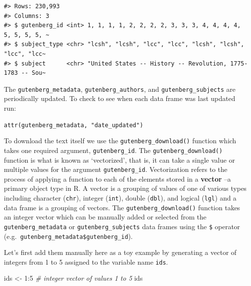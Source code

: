 \documentclass[
  letterpaper,
]{scrbook}
\newenvironment{Shaded}{\begin{snugshade}}{\end{snugshade}}
\newcommand{\CommentTok}[1]{\textcolor[rgb]{0.00,0.00,0.00}{\textit{#1}}}
\newcommand{\DecValTok}[1]{\textcolor[rgb]{0.00,0.00,0.00}{#1}}
\newcommand{\NormalTok}[1]{\textcolor[rgb]{0.00,0.00,0.00}{#1}}
\newcommand{\OtherTok}[1]{\textcolor[rgb]{0.00,0.00,0.00}{#1}}
\newcommand{\SpecialCharTok}[1]{\textcolor[rgb]{0.00,0.00,0.00}{#1}}
\begin{document}
\begin{verbatim}
#> Rows: 230,993
#> Columns: 3
#> $ gutenberg_id <int> 1, 1, 1, 1, 2, 2, 2, 2, 3, 3, 3, 4, 4, 4, 4, 5, 5, 5, 5, ~
#> $ subject_type <chr> "lcsh", "lcsh", "lcc", "lcc", "lcsh", "lcsh", "lcc", "lcc~
#> $ subject      <chr> "United States -- History -- Revolution, 1775-1783 -- Sou~
\end{verbatim}

\begin{tcolorbox}[enhanced jigsaw, title=\textcolor{quarto-callout-warning-color}{\faExclamationTriangle}\hspace{0.5em}{Tip}, titlerule=0mm, toptitle=1mm, colbacktitle=quarto-callout-warning-color!10!white, bottomtitle=1mm, left=2mm, colframe=quarto-callout-warning-color-frame, breakable, toprule=.15mm, colback=white, opacitybacktitle=0.6, leftrule=.75mm, rightrule=.15mm, bottomrule=.15mm, arc=.35mm, coltitle=black, opacityback=0]

The \texttt{gutenberg\_metadata}, \texttt{gutenberg\_authors}, and
\texttt{gutenberg\_subjects} are periodically updated. To check to see
when each data frame was last updated run:

\texttt{attr(gutenberg\_metadata,\ "date\_updated")}

\end{tcolorbox}

To download the text itself we use the \texttt{gutenberg\_download()}
function which takes one required argument, \texttt{gutenberg\_id}. The
\texttt{gutenberg\_download()} function is what is known as
`vectorized', that is, it can take a single value or multiple values for
the argument \texttt{gutenberg\_id}. Vectorization refers to the process
of applying a function to each of the elements stored in a
\textbf{vector} --a primary object type in R. A vector is a grouping of
values of one of various types including character (\texttt{chr}),
integer (\texttt{int}), double (\texttt{dbl}), and logical
(\texttt{lgl}) and a data frame is a grouping of vectors. The
\texttt{gutenberg\_download()} function takes an integer vector which
can be manually added or selected from the \texttt{gutenberg\_metadata}
or \texttt{gutenberg\_subjects} data frames using the \texttt{\$}
operator (e.g.~\texttt{gutenberg\_metadata\$gutenberg\_id}).

Let's first add them manually here as a toy example by generating a
vector of integers from 1 to 5 assigned to the variable name
\texttt{ids}.

\begin{Shaded}
\begin{Highlighting}[]
\NormalTok{ids }\OtherTok{\textless{}{-}} \DecValTok{1}\SpecialCharTok{:}\DecValTok{5} \CommentTok{\# integer vector of values 1 to 5}
\NormalTok{ids}
\end{Highlighting}
\end{Shaded}
\end{document}
